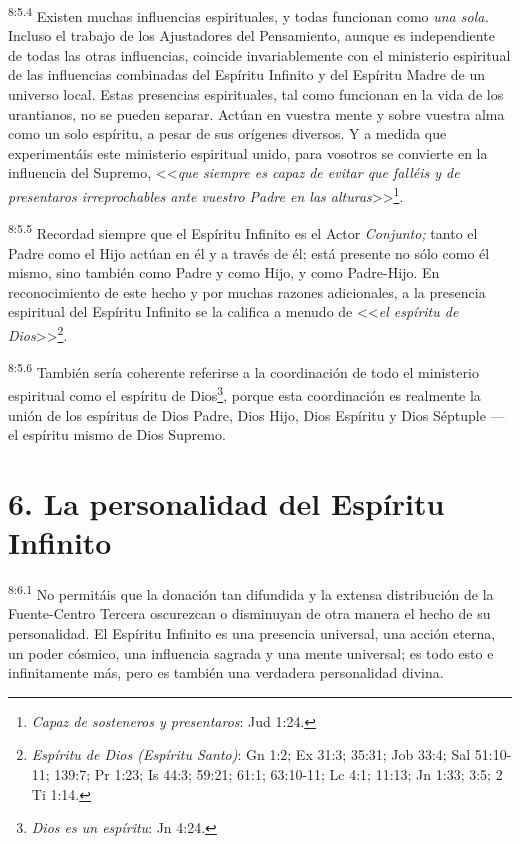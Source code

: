 \par
\textsuperscript{8:5.4} Existen muchas influencias espirituales, y todas funcionan como \textit{una sola.} Incluso el trabajo de los Ajustadores del Pensamiento, aunque es independiente de todas las otras influencias, coincide invariablemente con el ministerio espiritual de las influencias combinadas del Espíritu Infinito y del Espíritu Madre de un universo local. Estas presencias espirituales, tal como funcionan en la vida de los urantianos, no se pueden separar. Actúan en vuestra mente y sobre vuestra alma como un solo espíritu, a pesar de sus orígenes diversos. Y a medida que experimentáis este ministerio espiritual unido, para vosotros se convierte en la influencia del Supremo, <<\textit{que siempre es capaz de evitar que falléis y de presentaros irreprochables ante vuestro Padre en las alturas}>>\footnote{\textit{Capaz de sosteneros y presentaros}: Jud 1:24.}.

\par
\textsuperscript{8:5.5} Recordad siempre que el Espíritu Infinito es el Actor \textit{Conjunto;} tanto el Padre como el Hijo actúan en él y a través de él; está presente no sólo como él mismo, sino también como Padre y como Hijo, y como Padre-Hijo. En reconocimiento de este hecho y por muchas razones adicionales, a la presencia espiritual del Espíritu Infinito se la califica a menudo de <<\textit{el espíritu de Dios}>>\footnote{\textit{Espíritu de Dios (Espíritu Santo)}: Gn 1:2; Ex 31:3; 35:31; Job 33:4; Sal 51:10-11; 139:7; Pr 1:23; Is 44:3; 59:21; 61:1; 63:10-11; Lc 4:1; 11:13; Jn 1:33; 3:5; 2 Ti 1:14.}.

\par
\textsuperscript{8:5.6} También sería coherente referirse a la coordinación de todo el ministerio espiritual como el espíritu de Dios\footnote{\textit{Dios es un espíritu}: Jn 4:24.}, porque esta coordinación es realmente la unión de los espíritus de Dios Padre, Dios Hijo, Dios Espíritu y Dios Séptuple ---el espíritu mismo de Dios Supremo.

\section*{6. La personalidad del Espíritu Infinito}
\par
\textsuperscript{8:6.1} No permitáis que la donación tan difundida y la extensa distribución de la Fuente-Centro Tercera oscurezcan o disminuyan de otra manera el hecho de su personalidad. El Espíritu Infinito es una presencia universal, una acción eterna, un poder cósmico, una influencia sagrada y una mente universal; es todo esto e infinitamente más, pero es también una verdadera personalidad divina.

